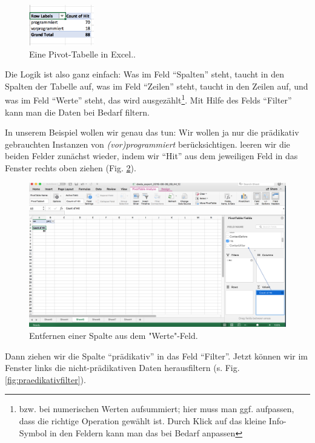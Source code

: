 \documentclass[]{article}
\let\rmarkdownfootnote\footnote%
\def\footnote{\protect\rmarkdownfootnote}
\begin{document}
\begin{figure}
\includegraphics[width=1.11in]{docs/fig/excel_simplepivot} \caption{Eine Pivot-Tabelle in Excel..}\label{fig:excelpivotsimple}
\end{figure}

Die Logik ist also ganz einfach: Was im Feld ``Spalten'' steht, taucht
in den Spalten der Tabelle auf, was im Feld ``Zeilen'' steht, taucht in
den Zeilen auf, und was im Feld ``Werte'' steht, das wird
ausgezählt\footnote{bzw. bei numerischen Werten aufsummiert; hier muss
  man ggf. aufpassen, dass die richtige Operation gewählt ist. Durch
  Klick auf das kleine Info-Symbol in den Feldern kann man das bei
  Bedarf anpassen}. Mit Hilfe des Felds ``Filter'' kann man die Daten
bei Bedarf filtern.

In unserem Beispiel wollen wir genau das tun: Wir wollen ja nur die
prädikativ gebrauchten Instanzen von \emph{(vor)programmiert}
berücksichtigen. leeren wir die beiden Felder zunächst wieder, indem wir
``Hit'' aus dem jeweiligen Feld in das Fenster rechts oben ziehen (Fig.
\ref{fig:countofhit}).

\begin{figure}
\includegraphics[width=6.36in]{docs/fig/countofhit} \caption{Entfernen einer Spalte aus dem "Werte"-Feld.}\label{fig:countofhit}
\end{figure}

Dann ziehen wir die Spalte ``prädikativ'' in das Feld ``Filter''. Jetzt
können wir im Fenster links die nicht-prädikativen Daten herausfiltern
(s. Fig. \ref{fig:praedikativfilter}).
\end{document}
